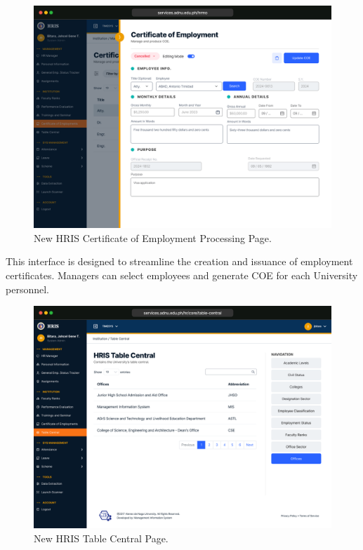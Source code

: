     \begin{figure}[H]
        \centering
        \includegraphics[width=1\linewidth]{figures/app/coe-info.png}
        \caption{New HRIS Certificate of Employment Processing Page.}
        \label{fig:app-coe-info}
    \end{figure}

    This interface is designed to streamline the creation and issuance of employment certificates. Managers can select employees and generate COE for each University personnel.

    \begin{figure}[H]
        \centering
        \includegraphics[width=1\linewidth]{figures/app/table-central.png}
        \caption{New HRIS Table Central Page.}
        \label{fig:app-table-central}
    \end{figure}

